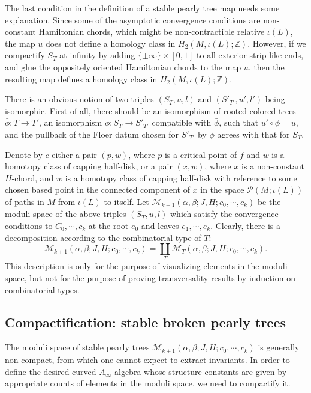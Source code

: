 \documentclass{amsart}
\numberwithin{equation}{section}
\numberwithin{figure}{section}
\begin{document}
	The last condition in the definition of a stable pearly tree map needs some explanation. Since some of the asymptotic convergence conditions are non-constant Hamiltonian chords, which might be non-contractible relative $\iota(L)$, the map $u$ does not define a homology class in $H_{2}(M, \iota(L); \mathbb{Z})$. However, if we compactify $S_{T}$ at infinity by adding $\{\pm \infty\} \times [0, 1]$ to all exterior strip-like ends, and glue the oppositely oriented Hamiltonian chords to the map $u$, then the resulting map defines a homology class in $H_{2}(M, \iota(L); \mathbb{Z})$.
\par
	There is an obvious notion of two triples $(S_{T}, u, l)$ and $(S'_{T'}, u', l')$ being isomorphic. First of all, there should be an isomorphism of rooted colored trees $\bar{\phi}: T \to T'$, an isomorphism $\phi: S_{T} \to S'_{T'}$ compatible with $\bar{\phi}$, such that $u' \circ \phi = u$, and the pullback of the Floer datum chosen for $S'_{T'}$ by $\phi$ agrees with that for $S_{T}$. \par
	Denote by $c$ either a pair $(p, w)$, where $p$ is a critical point of $f$ and $w$ is a homotopy class of capping half-disk, or a pair $(x, w)$, where $x$ is a non-constant $H$-chord, and $w$ is a homotopy class of capping half-disk with reference to some chosen based point in the connected component of $x$ in the space $\mathcal{P}(M; \iota(L))$ of paths in $M$ from $\iota(L)$ to itself. Let $\mathcal{M}_{k+1}(\alpha, \beta; J, H; c_{0}, \cdots, c_{k})$ be the moduli space of the above triples $(S_{T}, u, l)$ which satisfy the convergence conditions to $C_{0}, \cdots, c_{k}$ at the root $e_{0}$ and leaves $e_{1}, \cdots, e_{k}$. Clearly, there is a decomposition according to the combinatorial type of $T$:
\begin{equation}
\mathcal{M}_{k+1}(\alpha, \beta; J, H; c_{0}, \cdots, c_{k}) = \coprod_{T} \mathcal{M}_{T}(\alpha, \beta; J, H; c_{0}, \cdots, c_{k}).
\end{equation} 
This description is only for the purpose of visualizing elements in the moduli space, but not for the purpose of proving transversality results by induction on combinatorial types. \par

\subsection{Compactification: stable broken pearly trees}
	The moduli space of stable pearly trees $\mathcal{M}_{k+1}(\alpha, \beta; J, H; c_{0}, \cdots, c_{k})$ is generally non-compact, from which one cannot expect to extract invariants. In order to define the desired curved $A_{\infty}$-algebra whose structure constants are given by appropriate counts of elements in the moduli space, we need to compactify it. \par
\end{document}
